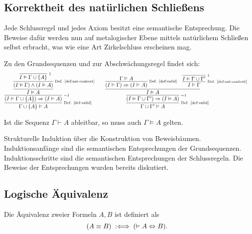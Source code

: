 \subsection{Korrektheit des natürlichen Schließens}

Jede Schlussregel und jedes Axiom besitzt eine semantische Entsprechung.
Die Beweise dafür werden nun auf metalogischer Ebene mittels natürlichem
Schließen selbst erbracht, was wie eine Art Zirkelschluss erscheinen
mag.

Zu den Grundsequenzen und zur Abschwächungsregel findet sich:
\[
\begin{array}{@{}l@{\qquad}l}
\infer[\infernote{Def. \ref{def:valid}}]{\Gamma\cup\{A\}\models A}{
  \infer[\infernote{$\sim$1}]{(I\models \Gamma\cup\{A\})\cond (I\models A)}{
    \infer{I\models A}{
      \infer[\infernote{Def. \ref{def:sat-context}}]{(I\models\Gamma)\land (I\models A)}{
        \infer[\infernote{1}]{I\models\Gamma\cup\{A\}}{}}}}}
&
\infer[\infernote{Def. \ref{def:valid}}]{\Gamma\cup\Gamma'\models A}{
  \infer[\infernote{$\sim$1}]{(I\models\Gamma\cup\Gamma')\cond (I\models A)}{
    \infer{I\models A}{
      \infer[\infernote{Def. \ref{def:valid}}]{(I\models\Gamma)\cond (I\models A)}{
        \Gamma\models A}
    & \infer[\infernote{Def. \ref{def:sat-context}}]{I\models\Gamma}{
        \infer[\infernote{1}]{I\models\Gamma\cup\Gamma'}{}}}}}
\end{array}
\]
\begin{Satz}\newlinefirst
Ist die Sequenz $\Gamma\vdash A$ ableitbar, so muss auch
$\Gamma\models A$ gelten.
\end{Satz}
\begin{Beweis}
Strukturelle Induktion über die Konstruktion von Beweisbäumen.
Induktionsanfänge sind die semantischen Entsprechungen
der Grundsequenzen. Induktionsschritte sind die semantischen
Entsprechungen der Schlussregeln. Die Beweise der Entsprechungen
wurden bereits diskutiert.\,\qedsymbol
\end{Beweis}


\newpage
\subsection{Logische Äquivalenz}
\begin{Definition}\newlinefirst
Die Äquivalenz zweier Formeln $A,B$ ist definiert als
\[(A\equiv B)\;:\Longleftrightarrow\; (\vDash A\Leftrightarrow B).\]
\end{Definition}

